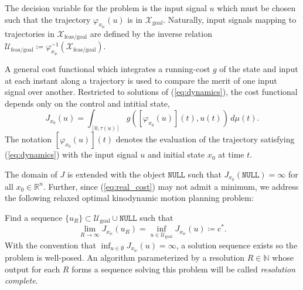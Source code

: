 \documentclass{llncs}
\newcommand{\NULL}{\ensuremath{\mathtt{NULL}}\xspace}
\begin{document}
%
The decision variable for the problem is the input signal $u$ which must be chosen such that the trajectory $\varphi_{x_\mathrm{ic}}(u)$ is in $\mathcal{X}_\mathrm{goal}$.
%
Naturally, input signals mapping to trajectories in $\mathcal{X}_\mathrm{feas/goal}$ are defined by the inverse relation  $\mathcal{U}_\mathrm{feas/goal} \coloneqq \varphi_{x_\mathrm{ic}}^{-1}(\mathcal{X}_\mathrm{feas/goal})$. 

A general cost functional which integrates a running-cost $g$ of the state and input at each instant along a trajectory is used to compare the merit of one input signal over another.
%
Restricted to solutions of (\ref{eq:dynamics}), the cost functional depends only on the control and intitial state, 
%
\begin{equation}
J_{x_{0}}(u)=\int_{[0,\tau(u)]}g([\varphi_{x_{0}}(u)](t),u(t))\, d\mu(t).\label{eq:real_cost}
\end{equation}
%
The notation $[\varphi_{x_{0}}(u)](t)$ denotes the evaluation of the trajectory satisfying (\ref{eq:dynamics}) with the input signal $u$ and initial state $x_{0}$ at time $t$. 

The domain of $J$ is extended with the object \NULL such that $J_{x_0}(\NULL)=\infty$ for all $x_0\in\mathbb{R}^{n}$.
%
Further, since (\ref{eq:real_cost}) may not admit a minimum, we address the following relaxed optimal kinodynamic motion planning problem:
% 
\begin{problem}\label{Problem}
Find a sequence $\{u_{R}\}\subset\mathcal{U}_\mathrm{goal}\cup \NULL$ such that 
%
\begin{equation}
\lim_{R\rightarrow\infty}J_{x_\mathrm{ic}}(u_R)=\inf_{u\in\mathcal{U}_\mathrm{goal}}J_{x_\mathrm{ic}}(u)\coloneqq c^{*}.\label{eq:meaningful_problem}
\end{equation}
%
With the convention that $\inf_{u\in\emptyset}J_{x_\mathrm{ic}}(u)=\infty$, a solution sequence exists so the problem is well-posed. An algorithm parameterized by a resolution $R \in \mathbb{N}$ whose output for each $R$ forms a sequence solving this problem will be called \textit{resolution complete}.
\end{problem}
\end{document}
